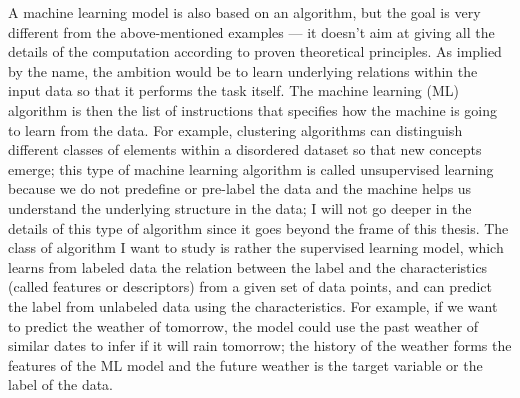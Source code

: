 \documentclass[main]{subfiles}
\begin{document}
A machine learning model is also based on an algorithm, but the goal is very different from the above-mentioned examples --- it doesn't aim at giving all the details of the computation according to proven theoretical principles. As implied by the name, the ambition would be to learn underlying relations within the input data so that it performs the task itself. The machine learning (ML) algorithm is then the list of instructions that specifies how the machine is going to learn from the data. For example, clustering algorithms can distinguish different classes of elements within a disordered dataset so that new concepts emerge; this type of machine learning algorithm is called unsupervised learning because we do not predefine or pre-label the data and the machine helps us understand the underlying structure in the data; I will not go deeper in the details of this type of algorithm since it goes beyond the frame of this thesis. The class of algorithm I want to study is rather the supervised learning model, which learns from labeled data the relation between the label and the characteristics (called features or descriptors) from a given set of data points, and can predict the label from unlabeled data using the characteristics. For example, if we want to predict the weather of tomorrow, the model could use the past weather of similar dates to infer if it will rain tomorrow; the history of the weather  forms the features of the ML model and the future weather is the target variable or the label of the data.
\end{document}
